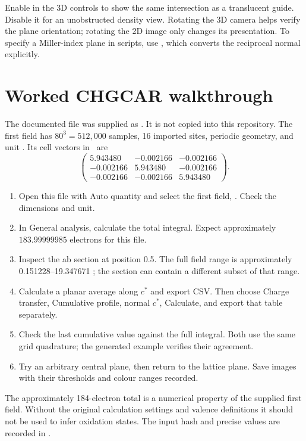 Enable  in the 3D controls to show the same intersection as a translucent guide. Disable it for an unobstructed density view. Rotating the 3D camera helps verify the plane orientation; rotating the 2D image only changes its presentation. To specify a Miller-index plane in scripts, use , which converts the reciprocal normal explicitly.


\section{Worked CHGCAR walkthrough}
The documented file was supplied as . It is not copied into this repository. The first field has $80^3=512{,}000$ samples, 16 imported sites, periodic geometry, and unit \densityunit. Its cell vectors in \angstrom\ are
\[
\begin{pmatrix}
5.943480&-0.002166&-0.002166\\
-0.002166&5.943480&-0.002166\\
-0.002166&-0.002166&5.943480
\end{pmatrix}.
\]
\begin{enumerate}
\item Open this file with Auto quantity and select the first field, . Check the dimensions and unit.
\item In General analysis, calculate the total integral. Expect approximately $183.99999985$ electrons for this file.
\item Inspect the ab section at position 0.5. The full field range is approximately 0.151228--19.347671 \densityunit; the section can contain a different subset of that range.
\item Calculate a planar average along $c^*$ and export CSV. Then choose Charge transfer, Cumulative profile, normal $c^*$, Calculate, and export that table separately.
\item Check the last cumulative value against the full integral. Both use the same grid quadrature; the generated example verifies their agreement.
\item Try an arbitrary central plane, then return to the lattice plane. Save images with their thresholds and colour ranges recorded.
\end{enumerate}
The approximately 184-electron total is a numerical property of the supplied first field. Without the original calculation settings and valence definitions it should not be used to infer oxidation states. The input hash and precise values are recorded in .

